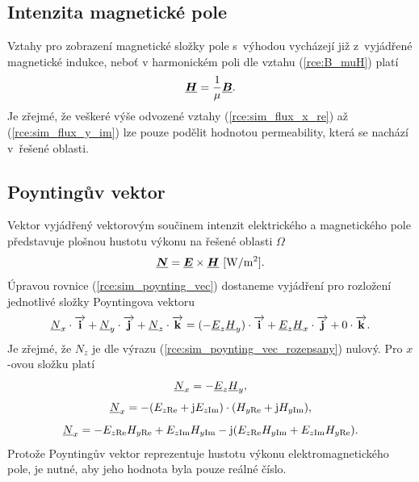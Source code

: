 \subsection*{Intenzita magnetické pole}
Vztahy pro zobrazení magnetické složky pole s~výhodou vycházejí již z~vyjádřené magnetické indukce, neboť v harmonickém poli dle vztahu (\ref{rce:B_muH}) platí
\begin{displaymath}
\mbox{\underline{\boldmath$H$}} = \frac{1}{\mu} \mbox{\underline{\boldmath$B$}}.
\end{displaymath}
Je zřejmé, že veškeré výše odvozené vztahy (\ref{rce:sim_flux_x_re}) až (\ref{rce:sim_flux_y_im}) lze pouze podělit hodnotou permeability, která se nachází v~řešené oblasti. 

\subsection*{Poyntingův vektor}
Vektor vyjádřený vektorovým součinem intenzit elektrického a magnetického pole představuje plošnou hustotu výkonu na řešené oblasti $\Omega$
\begin{equation}
	\mbox{\underline{\boldmath$N$}} = \mbox{\underline{\boldmath$E$}} \times\mbox{\underline{\boldmath$H$}}\mathrm{\ [W/m^{2}]}.
	\label{rce:sim_poynting_vec}
\end{equation}
Úpravou rovnice (\ref{rce:sim_poynting_vec}) dostaneme vyjádření pro rozložení jednotlivé složky Poyntingova vektoru
\begin{equation}
	{\underline{N}}_x \cdot\overrightarrow{\mathrm{\textbf{i}}} + {\underline{N}}_y \cdot\overrightarrow{\mathrm{\textbf{j}}} + {\underline{N}}_z \cdot\overrightarrow{\mathrm{\textbf{k}}} = (-{\underline{E}}_z {\underline{H}}_y) \cdot\overrightarrow{\mathrm{\textbf{i}}} + {\underline{E}}_z {\underline{H}}_x \cdot\overrightarrow{\mathrm{\textbf{j}}} + 0 \cdot\overrightarrow{\mathrm{\textbf{k}}}.
	\label{rce:sim_poynting_vec_rozepsany}
\end{equation}
Je zřejmé, že $N_z$ je dle výrazu (\ref{rce:sim_poynting_vec_rozepsany}) nulový. Pro $x$-ovou složku platí
\begin{displaymath}
	{\underline{N}}_x = -{\underline{E}}_z {\underline{H}}_y,
\end{displaymath}
\begin{displaymath}
	{\underline{N}}_x = -(E_{z\mathrm{Re}} + \mathrm{j} E_{z\mathrm{Im}})\cdot (H_{y\mathrm{Re}} + \mathrm{j} H_{y\mathrm{Im}}),
\end{displaymath}
\begin{displaymath}
	{\underline{N}}_x = - E_{z\mathrm{Re}} H_{y\mathrm{Re}} + E_{z\mathrm{Im}} H_{y\mathrm{Im}} - \mathrm{j} (E_{z\mathrm{Re}} H_{y\mathrm{Im}} + E_{z\mathrm{Im}} H_{y\mathrm{Re}}).
\end{displaymath}
Protože Poyntingův vektor reprezentuje hustotu výkonu elektromagnetického pole, je nutné, aby jeho hodnota byla pouze reálné číslo.
